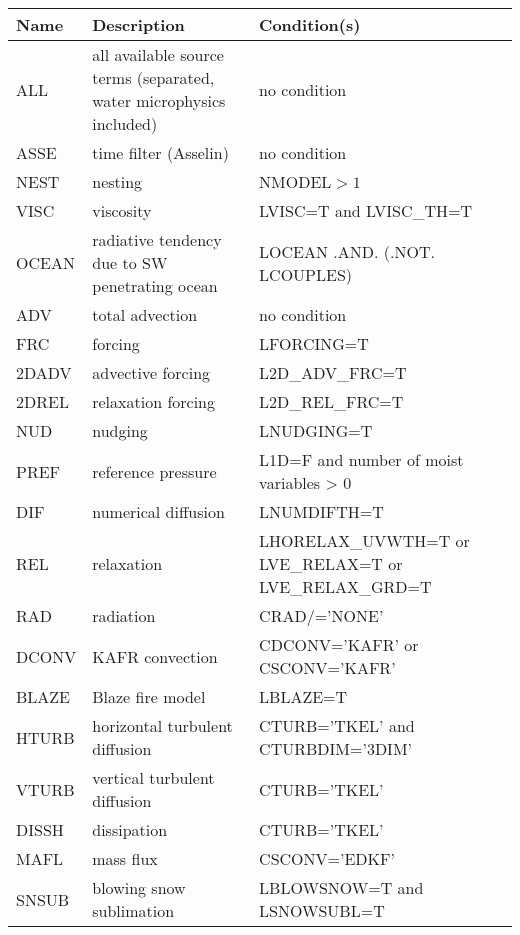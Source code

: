 \begin{longtable} {|p{}|p{}|p{}|}
\hline
Name & Description & Condition(s) \\
\hline \hline
\endhead
ALL    & all available source terms (separated,  water microphysics included) & no condition \\\hline \hline
ASSE   & time filter (Asselin)          & no condition                            \\\hline
NEST   & nesting                        & NMODEL$>1$                              \\\hline
VISC   & viscosity                      & LVISC=T and LVISC\_TH=T                 \\\hline
OCEAN  & radiative tendency due to SW penetrating ocean & LOCEAN .AND. (.NOT. LCOUPLES) \\\hline
ADV    & total advection                & no condition                            \\\hline
FRC    & forcing                        & LFORCING=T                              \\\hline
2DADV  & advective forcing              & L2D\_ADV\_FRC=T                         \\\hline
2DREL  & relaxation forcing             & L2D\_REL\_FRC=T                         \\\hline
NUD    & nudging                        & LNUDGING=T                              \\\hline
PREF   & reference pressure             & L1D=F and number of moist variables > 0 \\\hline
DIF    & numerical diffusion            & LNUMDIFTH=T                             \\\hline
REL    & relaxation                     & LHORELAX\_UVWTH=T or LVE\_RELAX=T or LVE\_RELAX\_GRD=T \\\hline
RAD    & radiation                      & CRAD/='NONE'                            \\\hline
DCONV  & KAFR convection                & CDCONV='KAFR' or CSCONV='KAFR'          \\\hline
BLAZE  & Blaze fire model               & LBLAZE=T                                \\\hline
HTURB  & horizontal turbulent diffusion & CTURB='TKEL' and CTURBDIM='3DIM'        \\\hline
VTURB  & vertical turbulent diffusion   & CTURB='TKEL'                            \\\hline
DISSH  & dissipation                    & CTURB='TKEL'                            \\\hline
MAFL   & mass flux                      & CSCONV='EDKF'                           \\\hline
SNSUB  & blowing snow sublimation       & LBLOWSNOW=T and LSNOWSUBL=T             \\\hline
\end{longtable}

